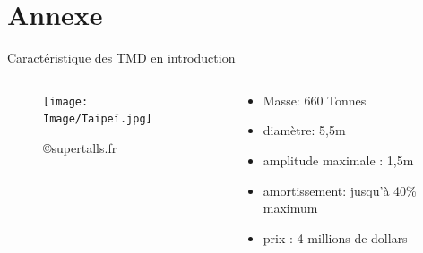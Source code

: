 \documentclass{beamer}
\begin{document}
	
	
	
	
	
	
	
	
	\section{Annexe}
	\begin{frame}{Caractéristique des TMD en introduction}
		\begin{columns}
			
		
		\begin{column}{0.5\textwidth}
			
		
		\begin{figure}
			\texttt{[image: Image/Taipeï.jpg]}
			\caption{\copyright supertalls.fr} 
		\end{figure}
	\end{column}
	\begin{column}{0.5\textwidth}
		\begin{itemize}
			\item Masse: 660 Tonnes
			\item diamètre: 5,5m
			\item amplitude maximale : 1,5m 
			\item amortissement: jusqu'à 40\% maximum
			\item prix : 4 millions de dollars
		\end{itemize}
	\end{column}

\end{columns}
	\end{frame}
\end{document}
